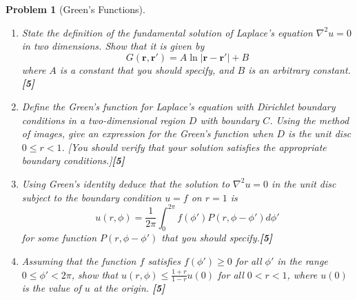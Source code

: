 \documentclass[a4paper]{article}
\theoremstyle{new}
\newtheorem{qns}{Problem}[section]
\begin{document}
\begin{qns}[Green's Functions]\leavevmode
\begin{enumerate}[label=(\alph*)]
\item State the definition of the fundamental solution of Laplace’s equation $\nabla^2u=0$ in two dimensions. Show that it is given by
$$G(\mathbf{r}, \mathbf{r'}) = A\ln |\mathbf{r} −\mathbf{r'}| + B$$
where $A$ is a constant that you should specify, and $B$ is an arbitrary constant.\hfill\textbf{[5]}
\item Define the Green’s function for Laplace’s equation with Dirichlet boundary conditions in a two-dimensional region $D$ with boundary $C$. Using the method of images, give an expression for the Green’s function when $D$ is the unit disc $0\leq r<1$. [You should verify that your solution satisfies the appropriate boundary conditions.]\hfill\textbf{[5]}
\item Using Green’s identity deduce that the solution to $\nabla^2u=0$ in the unit disc subject to the boundary condition $u = f$ on $r = 1$ is
$$u(r,\phi)=\frac{1}{2\pi}\int_0^{2\pi}f(\phi')P(r,\phi-\phi')d\phi'$$
for some function $P(r,\phi-\phi')$ that you should specify.\hfill\textbf{[5]}
\item Assuming that the function $f$ satisfies $f(\phi')\geq0$ for all $\phi'$ in the range $0\leq\phi'<2\pi$, show that $u(r,\phi)\leq\frac{1+r}{1-r}u(0)$ for all $0 < r < 1$, where $u(0)$ is the value of $u$ at the origin. \hfill\textbf{[5]}
\end{enumerate}
\end{qns}
\end{document}
